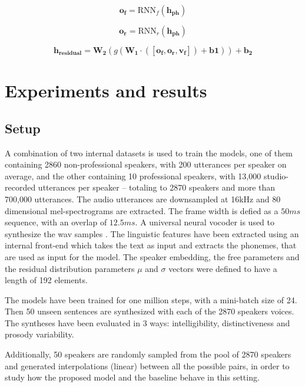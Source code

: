 \begin{equation}
 \label{eq:rnn1}
\mathbf{o_f} = \text{RNN}_f(\mathbf{h_{ph}})
\end{equation}

\begin{equation}
 \label{eq:rnn2}
\mathbf{o_r} = \text{RNN}_r(\mathbf{h_{ph}})
\end{equation}

\begin{equation}
 \label{eq:residual}
\mathbf{h_{residual}} = \mathbf{W_2}(g(\mathbf{W_1}\cdot([\mathbf{o_f}, \mathbf{o_r}, \mathbf{v_f}]) + \mathbf{b1} )) +\mathbf{ b_2}
\end{equation}

\section{Experiments and results}
\subsection{Setup}
 A combination of two internal datasets is used to train the models, one of them containing 2860 non-professional speakers, with 200 utterances per speaker on average, and the other containing 10 professional speakers, with 13,000 studio-recorded utterances per speaker – totaling to 2870 speakers and more than 700,000 utterances. The audio utterances are downsampled at 16kHz and 80 dimensional mel-spectrograms are extracted. The frame width is defied as a $50ms$ sequence, with an overlap of $12.5ms$. A universal neural vocoder is used to synthesize the wav samples \autocite{lorenzotrueba2019}. The linguistic features have been extracted using an internal front-end which takes the text as input and extracts the phonemes, that are used as input for the model. The speaker embedding, the free parameters and the residual distribution parameters $\mu$ and $\sigma$ vectors were defined to have a length of 192 elements.

 The models have been trained for one million steps, with a mini-batch size of 24. Then 50 unseen sentences are synthesized with each of the 2870 speakers voices. The syntheses have been evaluated in 3 ways: intelligibility, distinctiveness and prosody variability.

 Additionally, 50 speakers are randomly sampled from the pool of 2870 speakers and generated interpolations (linear) between all the possible pairs, in order to study how the proposed model and the baseline behave in this setting.

